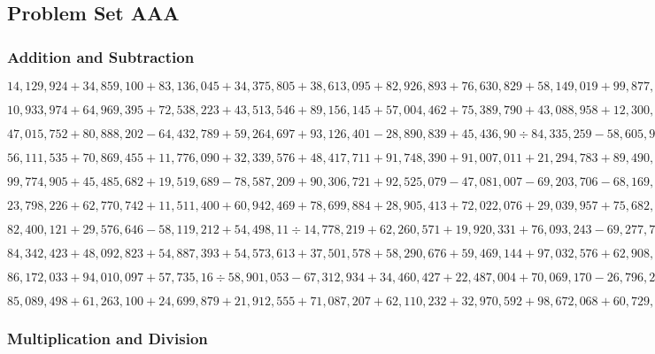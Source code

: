 \hypertarget{problem-set-aaa-3}{%
\subsection{Problem Set AAA}\label{problem-set-aaa-3}}

\hypertarget{addition-and-subtraction-359}{%
\subsubsection{Addition and
Subtraction}\label{addition-and-subtraction-359}}

\(14,129,924+34,859,100+83,136,045+34,375,805+38,613,095+82,926,893+76,630,829+58,149,019+99,877,698+38,251,091\)

\(10,933,974+64,969,395+72,538,223+43,513,546+89,156,145+57,004,462+75,389,790+43,088,958+12,300,931+42,571,873\)

\(47,015,752+80,888,202-64,432,789+59,264,697+93,126,401-28,890,839+45,436,90÷84,335,259-58,605,979+83,456,911\)

\(56,111,535+70,869,455+11,776,090+32,339,576+48,417,711+91,748,390+91,007,011+21,294,783+89,490,317+65,108,919\)

\(99,774,905+45,485,682+19,519,689-78,587,209+90,306,721+92,525,079-47,081,007-69,203,706-68,169,067+96,000,736\)

\(23,798,226+62,770,742+11,511,400+60,942,469+78,699,884+28,905,413+72,022,076+29,039,957+75,682,467+61,533,395\)

\(82,400,121+29,576,646-58,119,212+54,498,11÷14,778,219+62,260,571+19,920,331+76,093,243-69,277,750-23,433,259\)

\(84,342,423+48,092,823+54,887,393+54,573,613+37,501,578+58,290,676+59,469,144+97,032,576+62,908,790+53,292,811\)

\(86,172,033+94,010,097+57,735,16÷58,901,053-67,312,934+34,460,427+22,487,004+70,069,170-26,796,228-20,081,145\)

\(85,089,498+61,263,100+24,699,879+21,912,555+71,087,207+62,110,232+32,970,592+98,672,068+60,729,721+81,191,507\)

\hypertarget{multiplication-and-division-358}{%
\subsubsection{Multiplication and
Division}\label{multiplication-and-division-358}}

